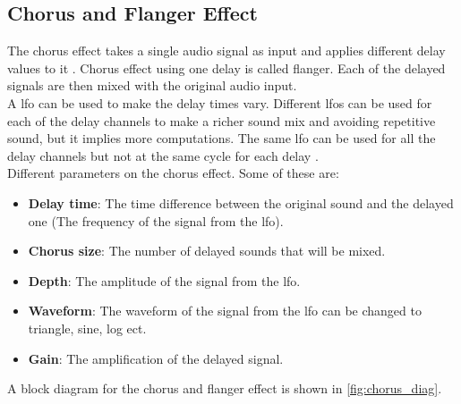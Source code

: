 \subsection{Chorus and Flanger Effect} \label{sec:chorus} 


The chorus effect takes a single audio signal as input and applies different delay values to it \citep{chorus_gibson} \citep{chorus_apple}. Chorus effect using one delay is called flanger. Each of the delayed signals are then mixed with the original audio input. \\
A \gls{lfo} can be used to make the delay times vary. Different \gls{lfo}s can be used for each of the delay channels to make a richer sound mix and avoiding repetitive sound, but it implies more computations. The same \gls{lfo} can be used for all the delay channels but not at the same cycle for each delay \citep{chorus_testtone}. \\ 

Different parameters on the chorus effect. Some of these are:\\
\begin{itemize}
\item \textbf{Delay time}: The time difference between the original sound and the delayed one (The frequency of the signal from the \gls{lfo}).
\item \textbf{Chorus size}: The number of delayed sounds that will be mixed.
\item \textbf{Depth}: The amplitude of the signal from the \gls{lfo}.
\item \textbf{Waveform}: The waveform of the signal from the \gls{lfo} can be changed to triangle, sine, log ect. \citep{hobby_hour_chorus}
\item \textbf{Gain}: The amplification of the delayed signal.
\end{itemize} \citep{chorus_parameters}

A block diagram for  the chorus and flanger effect is shown in \autoref{fig:chorus_diag}.

